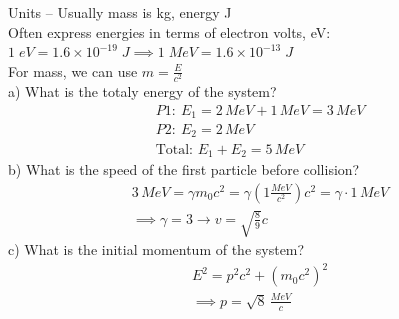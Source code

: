 \documentclass[a4paper, 11pt, fleqn, normalem]{report}
\begin{document}
Units -- Usually mass is kg, energy J \\
Often express energies in terms of electron volts, eV: $1\;eV = 1.6\times10^{-19}\;J \implies 1\;MeV = 1.6\times10^{-13}\;J$ \\
For mass, we can use $m = \frac{E}{c^{2}}$ \\
a) What is the totaly energy of the system?
\begin{gather*}
    P1:~E_{1} = 2\,MeV + 1\,MeV = 3\,MeV \\
    P2:~E_{2} = 2\,MeV \\
    \text{Total: }E_{1} + E_{2} = 5\,MeV
\end{gather*}
b) What is the speed of the first particle before collision?
\begin{gather*}
    3\,MeV = \gamma m_{0}c^{2} = \gamma(1\frac{MeV}{c^{2}})c^{2} = \gamma\cdot1\,MeV \\
    \implies \gamma = 3 \rightarrow v = \sqrt{\frac{8}{9}}c
\end{gather*}
c) What is the initial momentum of the system?
\begin{gather*}
    E^{2} = p^{2}c^{2} + (m_{0}c^{2})^{2} \\
    \implies p = \sqrt{8}\,\frac{MeV}{c}
\end{gather*}
\end{document}
